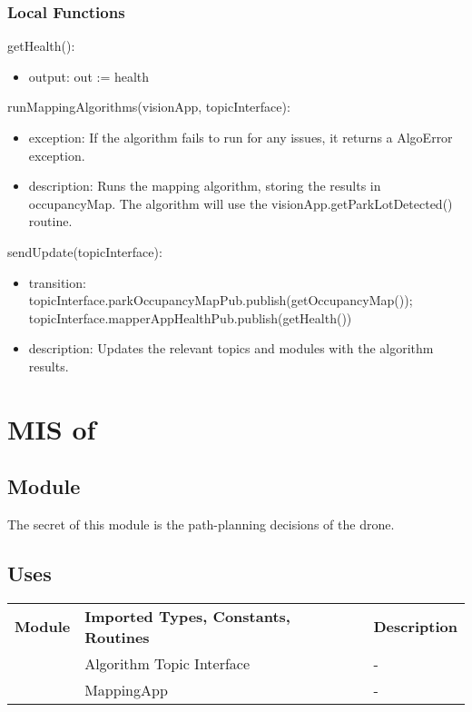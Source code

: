 \documentclass[12pt, titlepage]{article}
\begin{document}
\subsubsection{Local Functions}
\noindent getHealth():
\begin{itemize}
\item output: out := health 
\end{itemize}
\noindent runMappingAlgorithms(visionApp, topicInterface):
\begin{itemize}
\item exception: If the algorithm fails to run for any issues, it returns a AlgoError exception. 
\item description: Runs the mapping algorithm, storing the results in occupancyMap. The algorithm will use the visionApp.getParkLotDetected() routine.
\end{itemize}
\noindent sendUpdate(topicInterface):
\begin{itemize}
\item transition: topicInterface.parkOccupancyMapPub.publish(getOccupancyMap()); \\ topicInterface.mapperAppHealthPub.publish(getHealth())
\item description: Updates the relevant topics and modules with the algorithm results.
\end{itemize}
\newpage







\section{MIS of } \label{PATH_PLAN_APP} 
\subsection{Module}
The secret of this module is the path-planning decisions of the drone. 
\subsection{Uses}
\begin{center}
\begin{tabular}{p{2 cm} p{5cm} p{6.5cm} } 
\hline
\textbf{Module} & \textbf{Imported Types, Constants, Routines} & \textbf{Description} \\
\nameref{Algorithm Topic Interface} & Algorithm Topic Interface & - \\
\nameref{Mapper App} & MappingApp & - \\
\hline
\hline
\end{tabular}
\end{center}
\end{document}
